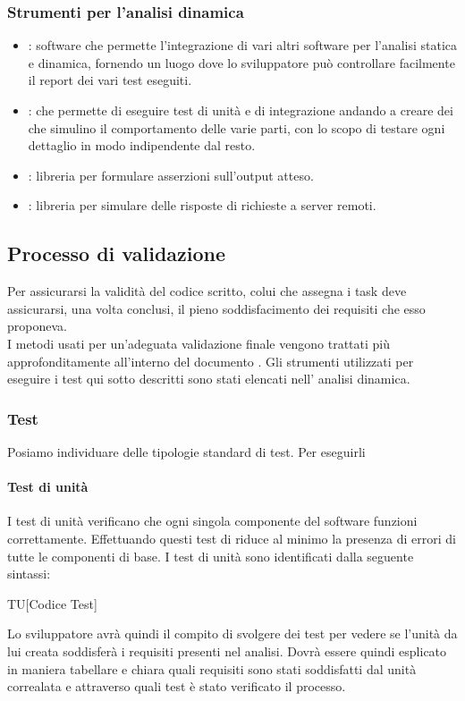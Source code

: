 \subsubsection{Strumenti per l'analisi dinamica}
\begin{itemize}
  \item \textbf{}: software che permette l'integrazione di vari altri software per l'analisi statica e dinamica, fornendo un luogo dove lo sviluppatore può controllare facilmente il report dei vari test eseguiti.
  \item \textbf{}:  che permette di eseguire test di unità e di integrazione andando a creare dei  che simulino il comportamento delle varie parti, con lo scopo di testare ogni dettaglio in modo indipendente dal resto.
  \item \textbf{}: libreria per formulare asserzioni sull'output atteso.
  \item \textbf{}: libreria per simulare delle risposte di richieste a server remoti.

\end{itemize}

\subsection{Processo di validazione}
Per assicurarsi la validità del codice scritto, colui che assegna i task deve assicurarsi, una volta conclusi, il pieno soddisfacimento dei requisiti che esso proponeva. \\
I metodi usati per un'adeguata validazione finale vengono trattati più approfonditamente all'interno del documento \pianoDiQualifica.
Gli strumenti utilizzati per eseguire i test qui sotto descritti sono stati elencati nell' analisi dinamica.

\subsubsection{Test}
Posiamo individuare delle tipologie standard di test.
Per eseguirli 

\paragraph{Test di unità}
I test di unità verificano che ogni singola componente del software funzioni correttamente. Effettuando questi test di riduce al minimo la presenza di errori di tutte le componenti di base. I test di unità sono identificati dalla seguente sintassi:
\begin{center}
  TU[Codice Test]
\end{center}
Lo sviluppatore avrà quindi il compito di svolgere dei test per vedere se l'unità da lui creata soddisferà i requisiti presenti nel analisi. Dovrà essere quindi esplicato in maniera tabellare e chiara quali requisiti sono stati soddisfatti dal unità correalata e attraverso quali test è stato verificato il processo.



